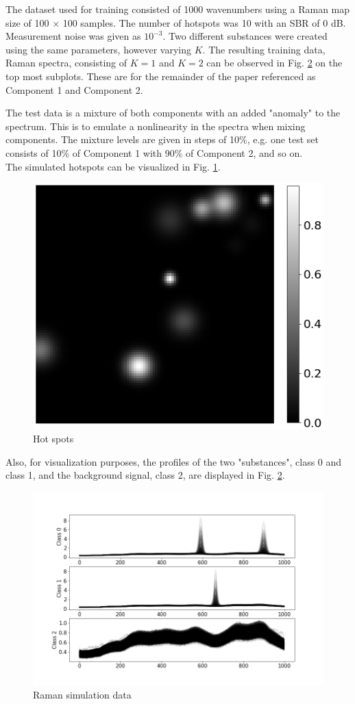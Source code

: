 \documentclass{article}
\begin{document}
The dataset used for training consisted of 1000 wavenumbers using a Raman map size of 100 $\times$ 100 samples. The number of hotspots was 10 with an SBR of 0 dB. Measurement noise was given as $10^{-3}$. Two different substances were created using the same parameters, however varying $K$. The resulting training data, Raman spectra, consisting of $K=1$ and $K=2$ can be observed in Fig. \ref{fig:raman} on the top most subplots. These are for the remainder of the paper referenced as Component 1 and Component 2.

The test data is a mixture of both components with an added "anomaly" to the spectrum. This is to emulate a nonlinearity in the spectra when mixing components. The mixture levels are given in steps of 10\%, e.g. one test set consists of 10\% of Component 1 with 90\% of Component 2, and so on.\\
The simulated hotspots can be visualized in Fig. \ref{fig:hotspots}.

\begin{figure}[H]
    \centering
\includegraphics[width=0.5\linewidth]{figures_3/raman_sim_hotspots.png}  
\caption{Hot spots}
\label{fig:hotspots}
\end{figure}

Also, for visualization purposes, the profiles of the two "substances", class 0 and class 1, and the background signal, class 2, are displayed in Fig. \ref{fig:raman}.

\begin{figure}[H]
	\centering
	\includegraphics[width=1\linewidth]{raman_sim_training_data_2.png}  
	\caption{Raman simulation data}
	\label{fig:raman}
\end{figure}
\end{document}
